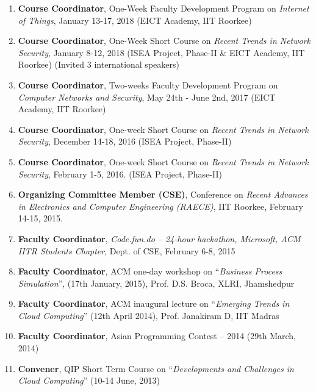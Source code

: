 \begin{enumerate} %

\item
\textbf{Course Coordinator}, One-Week Faculty Development Program on \textit{Internet of Things}, January 13-17, 2018 (EICT Academy, IIT Roorkee)

\item
\textbf{Course Coordinator}, One-Week Short Course on \textit{Recent Trends in Network Security}, January 8-12, 2018 (ISEA Project, Phase-II \& EICT Academy, IIT Roorkee) (Invited 3 international speakers)

\item
\textbf{Course Coordinator}, Two-weeks Faculty Development Program on \textit{Computer Networks and Security}, May 24th - June 2nd, 2017 (EICT Academy, IIT Roorkee)

\item
\textbf{Course Coordinator}, One-week Short Course on \textit{Recent Trends in Network Security}, December 14-18, 2016 (ISEA Project, Phase-II)

\item
\textbf{Course Coordinator}, One-week Short Course on \textit{Recent Trends in Network Security}, February 1-5, 2016. (ISEA Project, Phase-II)

\item
\textbf{Organizing Committee Member (CSE)}, Conference on \textit{Recent Advances in Electronics and Computer Engineering (RAECE)}, IIT Roorkee, February 14-15, 2015.

\item
\textbf{Faculty Coordinator}, \textit{Code.fun.do – 24-hour hackathon, Microsoft, ACM IITR Students Chapter}, Dept. of CSE, February 6-8, 2015

\item
\textbf{Faculty Coordinator}, ACM one-day workshop on “\textit{Business Process Simulation}”, (17th January, 2015), Prof. D.S. Broca, XLRI, Jhamshedpur

\item
\textbf{Faculty Coordinator}, ACM inaugural lecture on “\textit{Emerging Trends in Cloud Computing}” (12th April 2014), Prof. Janakiram D, IIT Madras 

\item
\textbf{Faculty Coordinator}, Asian Programming Contest – 2014 (29th March, 2014)

\item
\textbf{Convener}, QIP Short Term Course on “\textit{Developments and Challenges in Cloud Computing}” (10-14 June, 2013)


\end{enumerate}
